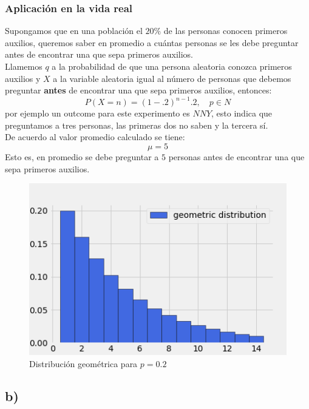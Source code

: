 \documentclass{article}
\begin{document}
\begin{tcolorbox}[breakable]
    \subsubsection*{Aplicación en la vida real}
    Supongamos que en una población el $20\%$ de las personas conocen primeros auxilios,
    queremos saber en promedio a cuántas personas se les debe preguntar 
    antes de encontrar una que sepa primeros auxilios. \\
    Llamemos $q$ a la probabilidad de que una persona aleatoria conozca primeros auxilios y $X$
    a la variable aleatoria igual al número de personas que debemos preguntar \textbf{antes} de encontrar una 
    que sepa primeros auxilios, entonces:
    \[ P(X=n) = (1-.2)^{n-1}.2, \quad p \in N \]
    por ejemplo un outcome para este experimento es $NNY$, esto indica que preguntamos a tres personas, 
    las primeras dos no saben y la tercera sí. \\
    De acuerdo al valor promedio calculado se tiene:
    \[\mu = 5\]
    Esto es, en promedio se debe preguntar a $5$ personas antes de encontrar una que sepa primeros auxilios.
    \begin{figure}[H]
        \centering
        \includegraphics[scale=0.7]{images/p7_geometric.png}
        \caption{Distribución geométrica para $p=0.2$}
    \end{figure}
    \subsection*{b)}

\end{tcolorbox}
\end{document}
